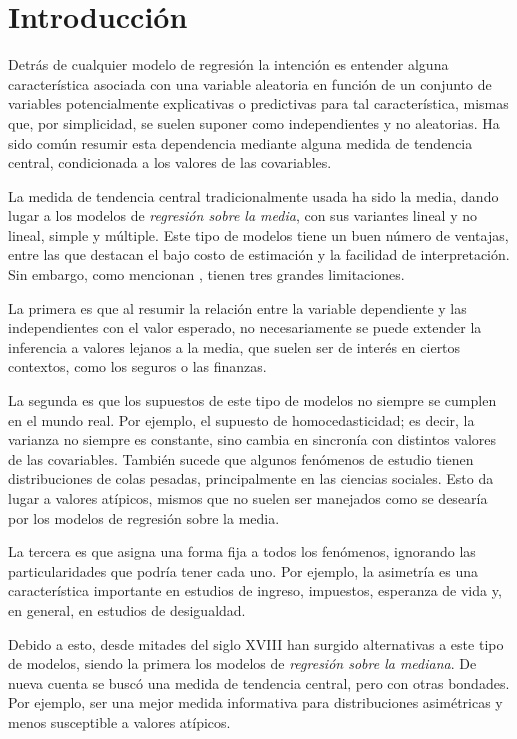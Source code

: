 \chapter{Introducci\'on}

Detr\'as de cualquier modelo de regresi\'on la intenci\'on es entender alguna caracter\'istica asociada con una variable aleatoria en funci\'on de un conjunto de variables potencialmente explicativas o predictivas para tal caracter\'istica, mismas que, por simplicidad, se suelen suponer como independientes y no aleatorias. Ha sido com\'un resumir esta dependencia mediante alguna medida de tendencia central, condicionada a los valores de las covariables.

La medida de tendencia central tradicionalmente usada ha sido la media, dando lugar a los modelos de \textit{regresi\'on sobre la media}, con sus variantes lineal y no lineal, simple y m\'ultiple. Este tipo de modelos tiene un buen n\'umero de ventajas, entre las que destacan el bajo costo de estimaci\'on y la facilidad de interpretaci\'on. Sin embargo, como mencionan \cite{Hao_FrecQuantReg}, tienen tres grandes limitaciones.

La primera es que al resumir la relaci\'on entre la variable dependiente y las independientes con el valor esperado, no necesariamente se puede extender la inferencia a valores lejanos a la media, que suelen ser de inter\'es en ciertos contextos, como los seguros o las finanzas.

La segunda es que los supuestos de este tipo de modelos no siempre se cumplen en el mundo real. Por ejemplo, el supuesto de homocedasticidad; es decir, la varianza no siempre es constante, sino cambia en sincron\'ia con distintos valores de las covariables. Tambi\'en sucede que algunos fen\'omenos de estudio tienen distribuciones de colas pesadas, principalmente en las ciencias sociales. Esto da lugar a valores at\'ipicos, mismos que no suelen ser manejados como se desear\'ia por los modelos de regresi\'on sobre la media.

La tercera es que asigna una forma fija a todos los fen\'omenos, ignorando las particularidades que podr\'ia tener cada uno. Por ejemplo, la asimetr\'ia es una caracter\'istica importante en estudios de ingreso, impuestos, esperanza de vida y, en general, en estudios de desigualdad.

Debido a esto, desde mitades del siglo XVIII han surgido alternativas a este tipo de modelos, siendo la primera los modelos de \textit{regresi\'on sobre la mediana}. De nueva cuenta se busc\'o una medida de tendencia central, pero con otras bondades. Por ejemplo, ser una mejor medida informativa para distribuciones asim\'etricas y menos susceptible a valores at\'ipicos. 

